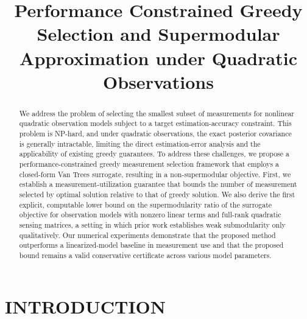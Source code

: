 \documentclass[letterpaper, 10 pt, conference]{ieeeconf}  %
\title{\LARGE \bf
Performance Constrained Greedy Selection and Supermodular Approximation under Quadratic Observations
}
\author{Wooyeong Cho, Tengyou Xu, Kaden Bautista and Ankur Mehta$%
\thanks{Department of Electrical and Computer Engineering,
University of California Los Angeles, Los Angeles, CA, USA.
        {\tt\small {chowy1628,tengyoux,kadenbautista21,mehtank} @ucla.edu}}%
}
\begin{document}
\maketitle
\thispagestyle{empty}
\pagestyle{empty}


\begin{abstract}
We address the problem of selecting the smallest subset of measurements for nonlinear quadratic observation models subject to a target estimation-accuracy constraint. This problem is NP-hard, and under quadratic observations, the exact posterior covariance is generally intractable, limiting the direct estimation-error analysis and the applicability of existing greedy guarantees. To address these challenges, we propose a performance-constrained greedy measurement selection framework that employs a closed-form Van Trees surrogate, resulting in a non-supermodular objective. First, we establish a measurement-utilization guarantee that bounds the number of measurement selected by optimal solution relative to that of greedy solution. We also derive the first explicit, computable lower bound on the supermodularity ratio of the surrogate objective for observation models with nonzero linear terms and full-rank quadratic sensing matrices, a setting in which prior work establishes weak submodularity only qualitatively. Our numerical experiments demonstrate that the proposed method outperforms a linearized-model baseline in measurement use and that the proposed bound remains a valid conservative certificate across various model parameters.

\end{abstract}
\section{INTRODUCTION}
\end{document}
